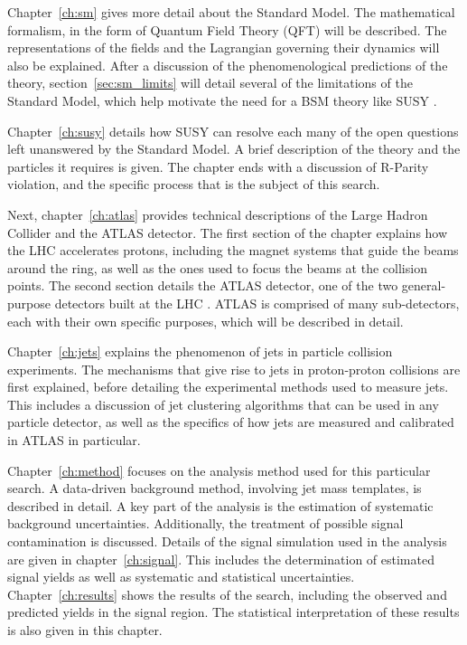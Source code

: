 Chapter~\ref{ch:sm} gives more detail about the Standard Model.
The mathematical formalism, in the form of Quantum Field Theory (QFT) will be described.
The representations of the fields and the Lagrangian governing their dynamics will also be explained.
After a discussion of the phenomenological predictions of the theory, section~\ref{sec:sm_limits} will detail
several of the limitations of the Standard Model, which help motivate the need for a BSM theory like SUSY .

Chapter~\ref{ch:susy} details how SUSY can resolve each many of the open questions left unanswered by the Standard Model.
A brief description of the theory and the particles it requires is given.
The chapter ends with a discussion of R-Parity violation, and the specific process that is the subject of this search.

Next, chapter~\ref{ch:atlas} provides technical descriptions of the Large Hadron Collider and the ATLAS detector.
The first section of the chapter explains how the LHC accelerates protons, including the magnet systems that guide the beams
around the ring, as well as the ones used to focus the beams at the collision points.
The second section details the ATLAS detector, one of the two general-purpose detectors built at the LHC .
ATLAS is comprised of many sub-detectors, each with their own specific purposes, which will be described in detail.

Chapter~\ref{ch:jets} explains the phenomenon of jets in particle collision experiments.
The mechanisms that give rise to jets in proton-proton collisions are first explained,
before detailing the experimental methods used to measure jets.
This includes a discussion of jet clustering algorithms that can be used in any particle detector,
as well as the specifics of how jets are measured and calibrated in ATLAS in particular.

Chapter~\ref{ch:method} focuses on the analysis method used for this particular search.
A data-driven background method, involving jet mass templates, is described in detail.
A key part of the analysis is the estimation of systematic background uncertainties.
Additionally, the treatment of possible signal contamination is discussed.
Details of the signal simulation used in the analysis are given in chapter~\ref{ch:signal}.
This includes the determination of estimated signal yields as well as systematic and statistical uncertainties.
Chapter~\ref{ch:results} shows the results of the search, including the observed and predicted yields in the signal region.
The statistical interpretation of these results is also given in this chapter.